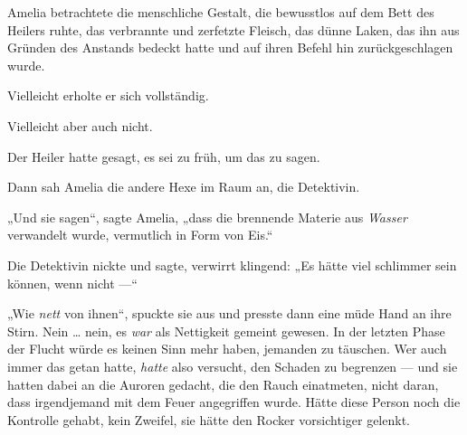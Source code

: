 Amelia betrachtete die menschliche Gestalt, die bewusstlos auf dem Bett des Heilers ruhte, das verbrannte und zerfetzte Fleisch, das dünne Laken, das ihn aus Gründen des Anstands bedeckt hatte und auf ihren Befehl hin zurückgeschlagen wurde.

Vielleicht erholte er sich vollständig.

Vielleicht aber auch nicht.

Der Heiler hatte gesagt, es sei zu früh, um das zu sagen.

Dann sah Amelia die andere Hexe im Raum an, die Detektivin.

„Und sie sagen“, sagte Amelia, „dass die brennende Materie aus \emph{Wasser} verwandelt wurde, vermutlich in Form von Eis.“

Die Detektivin nickte und sagte, verwirrt klingend:
„Es hätte viel schlimmer sein können, wenn nicht —“

„Wie \emph{nett} von ihnen“, spuckte sie aus und presste dann eine müde Hand an ihre Stirn. Nein … nein, es \emph{war} als Nettigkeit gemeint gewesen. In der letzten Phase der Flucht würde es keinen Sinn mehr haben, jemanden zu täuschen. Wer auch immer das getan hatte, \emph{hatte} also versucht, den Schaden zu begrenzen — und sie hatten dabei an die Auroren gedacht, die den Rauch einatmeten, nicht daran, dass irgendjemand mit dem Feuer angegriffen wurde. Hätte diese Person noch die Kontrolle gehabt, kein Zweifel, sie hätte den Rocker vorsichtiger gelenkt.

